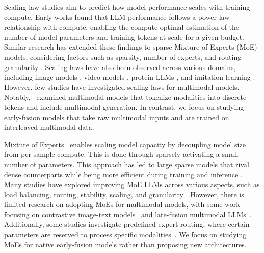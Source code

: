  Scaling law studies aim to predict how model
performance scales with training compute. Early works
\citep{kaplan2020scaling,hoffmann2022training} found that LLM performance follows
a power-law relationship with compute, enabling the compute-optimal estimation of the number of model parameters and training tokens at scale for a given budget. Similar research has
extended these findings to sparse Mixture of Experts (MoE) models, considering
factors such as sparsity, number of experts, and routing granularity
\citep{krajewski2024scalingmoe,clark2022unifiedscalingmoe,wangscalingmoe}.
Scaling laws have also been observed across various domains, including image
models \citep{fini2024multimodalaimv2}, video models
\citep{rajasegaran2025empirical}, protein LLMs \citep{scalingprotein}, and
imitation learning \citep{pearce2024scaling}. However, few studies have
investigated scaling laws for multimodal models.
Notably,~\citet{aghajanyan2023scalingmm} examined multimodal models that tokenize
modalities into discrete tokens and include multimodal generation. In contrast,
we focus on studying early-fusion models that take raw multimodal inputs and
are trained on interleaved multimodal data.




 Mixture of Experts~\citep{shazeer2017outrageously} enables scaling model capacity by decoupling
model size from per-sample compute. This is done through sparsely
activating a small number of parameters. This approach has led to large
sparse models that rival dense counterparts while being more efficient during
training and inference
\citep{fedus2022switch,sun2024hunyuan,jiang2024mixtral,liu2024deepseekv3,wei2024skywork}.
Many studies have explored improving MoE LLMs across various aspects, such as
load balancing, routing, stability, scaling, and granularity
\citep{lewis2021base,zoph2022st,lepikhin2020gshard}. However, there is limited
research on adopting MoEs for multimodal models, with some work focusing on contrastive
image-text models~\citep{mustafa2022multimodal} and late-fusion multimodal LLMs~\citep{lin2024moe,li2024aria}. Additionally, some studies investigate
predefined expert routing, where certain parameters are reserved to process specific modalities~\cite {bao2021vlmo,chen2024eve,shen2023scaling}. We focus on studying MoEs for native early-fusion models
rather than proposing new architectures.



